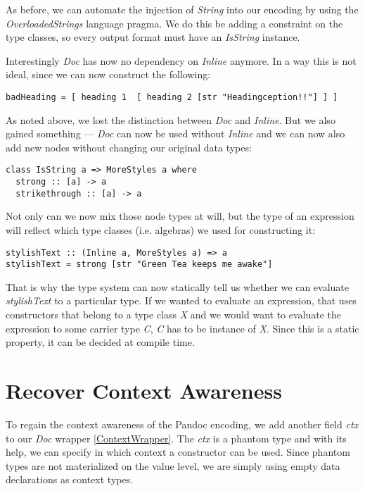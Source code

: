 \documentclass[format=acmsmall, review=true, screen=true, natbib=false]{acmart}
\begin{document}
As before, we can automate the injection of \emph{String} into our encoding by using
the \emph{OverloadedStrings} language pragma. We do this be adding a constraint on
the type classes, so every output format must have an \emph{IsString} instance.

Interestingly \emph{Doc} has now no dependency on \emph{Inline} anymore. In a way this is
not ideal, since we can now construct the following:

\begin{lstlisting}
badHeading = [ heading 1  [ heading 2 [str "Headingception!!"] ] ]
\end{lstlisting}

As noted above, we lost the distinction between \emph{Doc} and \emph{Inline}. But we also
gained something — \emph{Doc} can now be used without \emph{Inline} and we can now also
add new nodes without changing our original data types:

\begin{lstlisting}
class IsString a => MoreStyles a where
  strong :: [a] -> a
  strikethrough :: [a] -> a
\end{lstlisting}

Not only can we now mix those node types at will, but the type of an expression
will reflect which type classes (i.e. algebras) we used for constructing it:

\begin{lstlisting}
stylishText :: (Inline a, MoreStyles a) => a
stylishText = strong [str "Green Tea keeps me awake"]
\end{lstlisting}

That is why the type system can now statically tell us whether we can evaluate
\emph{stylishText} to a particular type. If we wanted to evaluate an expression, that
uses constructors that belong to a type class \emph{X} and we would want to evaluate
the expression to some carrier type \emph{C}, \emph{C} has to be instance of \emph{X}. Since
this is a static property, it can be decided at compile time.


\section{Recover Context Awareness}
\label{sec:org5ba4b2b}

To regain the context awareness of the Pandoc encoding, we add another field
\emph{ctx} to our \emph{Doc} wrapper \ref{ContextWrapper}. The \emph{ctx} is a
phantom type and with its help, we can specify in which context a constructor
can be used. Since phantom types are not materialized on the value level, we are
simply using empty data declarations as context types.
\end{document}
